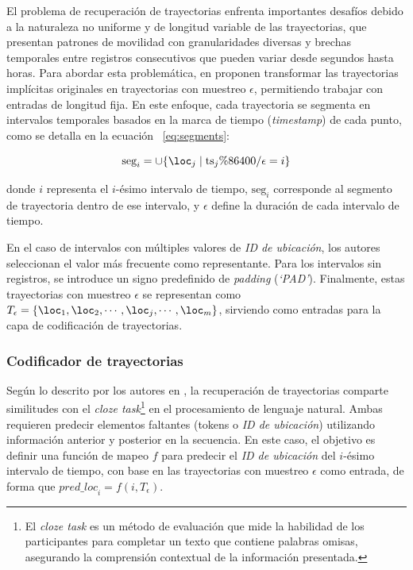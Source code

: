 El problema de recuperación de trayectorias enfrenta importantes desafíos debido a la naturaleza no uniforme y de longitud variable de las trayectorias, que presentan patrones de movilidad con granularidades diversas y brechas temporales entre registros consecutivos que pueden variar desde segundos hasta horas. Para abordar esta problemática, en \cite{si2023trajbert} proponen transformar las trayectorias implícitas originales en trayectorias con muestreo $\epsilon$, permitiendo trabajar con entradas de longitud fija. En este enfoque, cada trayectoria se segmenta en intervalos temporales basados en la marca de tiempo (\textit{timestamp}) de cada punto, como se detalla en la ecuación ~\ref{eq:segments}:

\begin{equation}
\text{seg}_i = \cup \{ \loc_j \mid \text{ts}_j \% 86400 / \epsilon = i \}
\label{eq:segments}
\end{equation}

\noindent
donde $i$ representa el $i$-ésimo intervalo de tiempo, $\text{seg}_i$ corresponde al segmento de trayectoria dentro de ese intervalo, y $\epsilon$ define la duración de cada intervalo de tiempo. 

En el caso de intervalos con múltiples valores de \textit{ID de ubicación}, los autores seleccionan el valor más frecuente como representante. Para los intervalos sin registros, se introduce un signo predefinido de \textit{padding} (\textit{‘PAD’}). Finalmente, estas trayectorias con muestreo $\epsilon$ se representan como $T_\epsilon = \{\loc_1, \loc_2, \cdots, \loc_j, \cdots, \loc_m\}$, sirviendo como entradas para la capa de codificación de trayectorias.

\subsubsection{Codificador de trayectorias}
\label{trajectory_encoder}

Según lo descrito por los autores en \cite{si2023trajbert}, la recuperación de trayectorias comparte similitudes con el \textit{cloze task}\footnote{El \textit{cloze task} es un método de evaluación que mide la habilidad de los participantes para completar un texto que contiene palabras omisas, asegurando la comprensión contextual de la información presentada.} en el procesamiento de lenguaje natural. Ambas requieren predecir elementos faltantes (tokens o \textit{ID de ubicación}) utilizando información anterior y posterior en la secuencia. En este caso, el objetivo es definir una función de mapeo $f$ para predecir el \textit{ID de ubicación} del $i$-ésimo intervalo de tiempo, con base en las trayectorias con muestreo $\epsilon$ como entrada, de forma que ${pred\_loc}_i = f(i, T_\epsilon)$.

